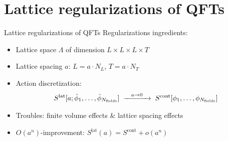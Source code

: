 \documentclass{beamer}
\begin{document}
\section{Lattice regularizations of QFTs}

\begin{frame}{Lattice regularizations of QFTs}
      Regularizations ingredients:
      \begin{itemize}
            \item Lattice space $\Lambda$ of dimension $L \times L \times L \times T$
            \item Lattice spacing $a$: $L = a\cdot N_L$, $T = a\cdot N_T$
            \item Action discretization:
            \begin{equation*}
                  S^\text{lat}[a;\tilde\phi_1,\dots,\tilde\phi_{N_\text{fields}}] \hspace*{1mm} \xrightarrow{\hspace*{3mm} a \rightarrow 0\hspace*{3mm}} \hspace*{1mm} S^\text{cont}[\phi_1,\dots,\phi_{N_\text{fields}}]
            \end{equation*}
            \item Troubles: finite volume effects \& lattice spacing effects
            \item $O(a^n)$-improvement:  $S^\text{lat}(a) = S^\text{cont} + o(a^{n})$
      \end{itemize}
\end{frame}
\end{document}
